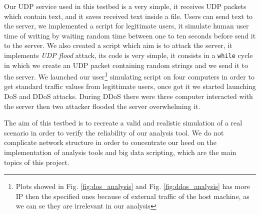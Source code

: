 Our UDP service used in this testbed is a very simple, it receives UDP packets which contain text, and it saves received text inside a file.
Users can send text to the server, we implemented a script for legitimate users, it simulate human user time of writing by waiting random time between one to ten seconds before send it to the server.
We also created a script which aim is to attack the server, it implements \textit{UDP flood} attack, its code is very simple, it consists in a \texttt{while} cycle in which we create an UDP packet containing random strings and we send it to the server.
We launched our user\footnote{Plots showed in Fig. \ref{fig:dos_analysis} and Fig. \ref{fig:ddos_analysis} has more IP then the specified ones because of external traffic of the host machine, as we can se they are irrelevant in our analysis} simulating script on four computers in order to get standard traffic values from legittimate users, once got it we started launching DoS and DDoS attacks. During DDoS there were three computer interacted with the server then two attacker flooded the server overwhelming it.    

The aim of this testbed is to recreate a valid and realistic simulation of a real scenario in order to verify the reliability of our analysis tool. 
We do not complicate network structure in order to concentrate our heed on the implementation of analysis tools and big data scripting, which are the main topics of this project.
  
